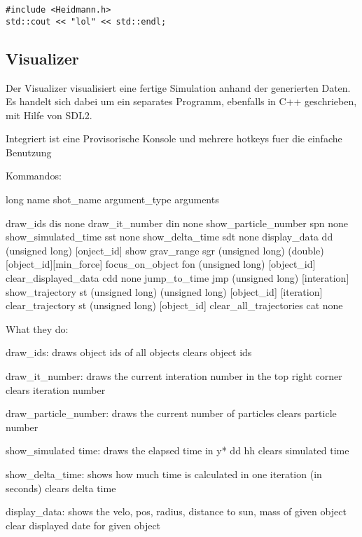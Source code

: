 \begin{verbatim}
#include <Heidmann.h>
std::cout << "lol" << std::endl;
\end{verbatim}


\subsection{Visualizer}
Der Visualizer visualisiert eine fertige Simulation anhand der generierten Daten.
Es handelt sich dabei um ein separates Programm, ebenfalls in C++ geschrieben,
mit Hilfe von SDL2.

Integriert ist eine Provisorische Konsole und mehrere hotkeys fuer die einfache Benutzung


Kommandos:

long name           shot_name           argument_type                   arguments

draw_ids                dis             none
draw_it_number          din             none
show_particle_number    spn             none
show_simulated_time     sst             none    
show_delta_time         sdt             none    
display_data            dd              (unsigned long)                 [onject_id]
show grav_range         sgr             (unsigned long) (double)        [object_id][min_force]
focus_on_object         fon             (unsigned long)                 [object_id]
clear_displayed_data    cdd             none 
jump_to_time            jmp             (unsigned long)                 [interation]
show_trajectory         st              (unsigned long) (unsigned long) [object_id] [iteration]
clear_trajectory        st              (unsigned long)                 [object_id]
clear_all_trajectories cat             none

What they do:

draw_ids:
    draws object ids of all objects
    clears object ids

draw_it_number:
    draws the current interation number in the top right corner
    clears iteration number

draw_particle_number:
    draws the current number of particles
    clears particle number

show_simulated time:
    draws the elapsed time in y* dd hh
    clears simulated time

show_delta_time:
    shows how much time is calculated in one iteration (in seconds)
    clears delta time

display_data:
    shows the velo, pos, radius, distance to sun, mass of given object
    clear displayed date for given object

